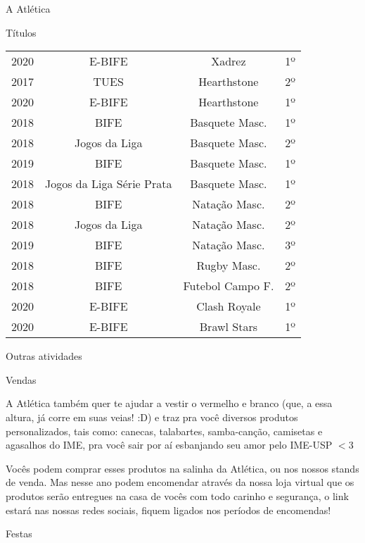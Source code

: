 \begin{secao}{A Atlética}
\begin{subsecao}{Títulos}
\begin{center}
\begin{tabular}{c|c|c|c}
    2020 & E-BIFE         & Xadrez          & 1º\\
    2017 & TUES           & Hearthstone     & 2º\\
    2020 & E-BIFE         & Hearthstone     & 1º\\
    2018 & BIFE           & Basquete Masc.  & 1º\\
    2018 & Jogos da Liga  & Basquete Masc.  & 2º\\
    2019 & BIFE           & Basquete Masc.  & 1º\\
    2018 & Jogos da Liga Série Prata  & Basquete Masc.  & 1º\\
    2018 & BIFE           & Natação Masc.   & 2º\\
    2018 & Jogos da Liga  & Natação Masc.   & 2º\\
    2019 & BIFE           & Natação Masc.   & 3º\\
    2018 & BIFE           & Rugby Masc.     & 2º\\
    2018 & BIFE           & Futebol Campo F.& 2º\\
    2020 & E-BIFE         & Clash Royale    & 1º\\
    2020 & E-BIFE         & Brawl Stars     & 1º\\
  \end{tabular}
\end{center}

\end{subsecao}
\begin{subsecao}{Outras atividades}

\begin{subsubsecao}{Vendas}

A Atlética também quer te ajudar a vestir o vermelho e branco (que, a essa
altura, já corre em suas veias! :D) e traz pra você diversos produtos
personalizados, tais como: canecas, talabartes,
samba-canção, camisetas e agasalhos do
IME, pra você sair por aí esbanjando seu amor pelo IME-USP $<$3

Vocês podem comprar esses produtos na salinha da Atlética, ou nos nossos
stands de venda. Mas nesse ano podem encomendar através da nossa loja
virtual que os produtos serão entregues na casa de vocês com todo carinho
e segurança, o link estará nas nossas redes sociais, fiquem ligados nos
períodos de encomendas!

\end{subsubsecao}
\begin{subsubsecao}{Festas}


\end{subsubsecao}
\end{subsecao}
\end{secao}
